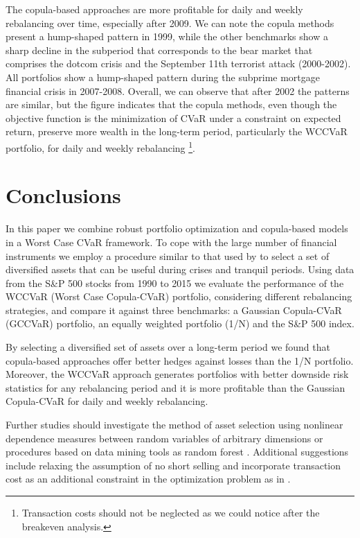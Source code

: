 \documentclass[a4paper,10pt]{article}
\begin{document}
The copula-based approaches are more profitable for daily and weekly rebalancing over time, especially after 2009. We can note the copula methods present a hump-shaped pattern in 1999, while the other benchmarks show a sharp decline in the subperiod that corresponds to the bear market that comprises the dotcom crisis and the September 11th terrorist attack (2000-2002). All portfolios show a hump-shaped pattern during the subprime mortgage financial crisis in 2007-2008. Overall, we can observe that after 2002 the patterns are similar, but the figure indicates that the copula methods, even though the objective function is the minimization of CVaR under a constraint on expected return, preserve more wealth in the long-term period, particularly the WCCVaR portfolio, for daily and weekly rebalancing \footnote{Transaction costs should not be neglected as we could notice after the breakeven analysis.}.



\section{Conclusions}

In this paper we combine robust portfolio optimization and copula-based models in a Worst Case CVaR framework. To cope with the large number of financial instruments we employ a procedure similar to that used by \citet{ggr06} to select a set of diversified assets that can be useful during crises and tranquil periods. Using data from the S\&P 500 stocks from 1990 to 2015 we evaluate the performance of the WCCVaR (Worst Case Copula-CVaR) portfolio, considering different rebalancing strategies, and compare it against three benchmarks: a Gaussian Copula-CVaR (GCCVaR) portfolio, an equally weighted portfolio (1/N) and the S\&P 500 index. 

By selecting a diversified set of assets over a long-term period we found that copula-based approaches offer better hedges against losses than the 1/N portfolio. Moreover, the WCCVaR approach generates portfolios with better downside risk statistics for any rebalancing period and it is more profitable than the Gaussian Copula-CVaR for daily and weekly rebalancing.

Further studies should investigate the method of asset selection using nonlinear dependence measures between random variables of arbitrary dimensions \citep{lopez2013randomized} or procedures based on data mining tools as random forest \citep{dlrz10}. Additional suggestions include relaxing the assumption of no short selling and incorporate transaction cost as an additional constraint in the optimization problem as in \citet{krokhmal2002}.



\newpage
\end{document}

